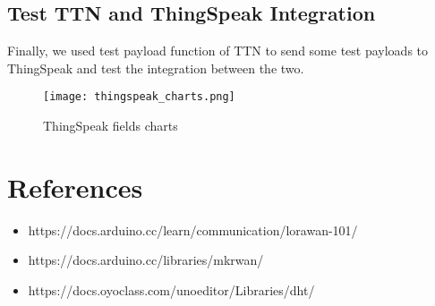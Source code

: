 \subsection{Test TTN and ThingSpeak Integration}
Finally, we used test payload function of TTN to send some test payloads to ThingSpeak and test the integration between the two.

\begin{figure}[H]
    \centering
    \texttt{[image: thingspeak\_charts.png]}
    \caption{ThingSpeak fields charts}
\end{figure}

\section{References}
\begin{itemize}
\item https://docs.arduino.cc/learn/communication/lorawan-101/
\item https://docs.arduino.cc/libraries/mkrwan/
\item https://docs.oyoclass.com/unoeditor/Libraries/dht/
\end{itemize}


